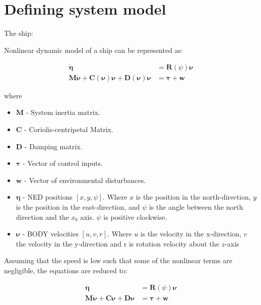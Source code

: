 \section{Defining system model}

\iffalse

The ship:

Nonlinear dynamic model of a ship can be represented as:

\begin{equation} \label{eq:dynamic_ship_model}
    \begin{aligned}
    \mathbf{\dot{\eta}} &= \mathbf{R}(\psi)\boldsymbol\nu \\
    \mathbf{M \dot{\nu}} + \mathbf{C}(\boldsymbol\nu) \boldsymbol\nu + \mathbf{D}(\boldsymbol\nu) \boldsymbol\nu &= \boldsymbol\tau + \mathbf{w}
    \end{aligned}
\end{equation}

where
\begin{itemize}
    \item $\mathbf{M}$ - System inertia matrix.
    \item $\mathbf{C}$ - Coriolis-centripetal Matrix.
    \item $\mathbf{D}$ - Damping matrix.
    \item $\boldsymbol\tau$ - Vector of control inputs.
    \item $\mathbf{w}$ - Vector of environmental disturbances.
    \item $\boldsymbol\eta$ - NED positions $[x, y, \psi]$. Where $x$ is the position in the north-direction, $y$ is the position in the east-direction, and $\psi$ is the angle between the north direction and the $x_b$ axis. $\psi$ is positive clockwise.
    \item $\boldsymbol\nu$ - BODY velocities $[u, v, r]$. Where $u$ is the velocity in the x-direction, $v$ the velocity in the y-direction and  r is rotation velocity about the $z$-axis
\end{itemize}

Assuming that the speed is low such that some of the nonlinear terms are negligible, the equations are reduced to:

\begin{subequations} \label{eq:low_speed_ship_model}
    \begin{align}
    \mathbf{\dot{\eta}} &= \mathbf{R}(\psi)\boldsymbol\nu \label{eq:low_speed_NED_velocity}
    \\
    \mathbf{M \dot{\nu}} + \mathbf{C} \boldsymbol\nu + \mathbf{D} \boldsymbol\nu &= \boldsymbol\tau + \mathbf{w} \label{eq:low_speed_control_inputs}
    \end{align}
\end{subequations}

